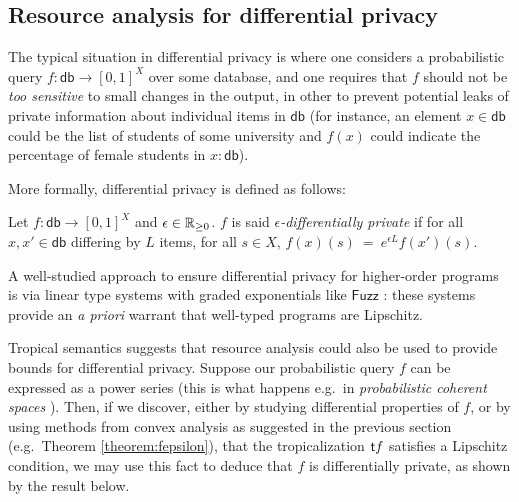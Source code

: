 

\subsection{Resource analysis for differential privacy}

The typical situation in differential privacy is where one considers a probabilistic query $f: \mathsf{db}\to [0,1]^{X}$ over some database, and one requires that $f$ should not be \emph{too sensitive} to small changes in the output, in other to prevent potential leaks of private information about individual items in $\mathsf{db}$ (for instance, an element $x\in\mathsf{db}$ could be the list of students of some university and $f(x)$ could indicate the percentage of female students in $x:\mathsf{db}$).

More formally, differential privacy is defined as follows:
\begin{definition}
Let $f: \mathsf{db}\to [0,1]^{X}$ and $\epsilon \in \mathbb{R}_{\geq 0}$. $f$ is said \emph{$\epsilon$-differentially private} if for all $x,x'\in \mathsf{db}$
differing by $L$ items, for all $s\in X$, 
$
f(x)(s) \ = \ e^{\epsilon L} f(x')(s)
$.
\end{definition}

A well-studied approach to ensure differential privacy for higher-order programs is via linear type systems with graded exponentials like $\mathsf{Fuzz}$ \cite{Reed2010}: these systems provide an \emph{a priori} warrant that well-typed programs are Lipschitz.

Tropical semantics suggests that resource analysis could also be used to provide bounds for differential privacy. 
Suppose our probabilistic query $f$ can be expressed as a power series (this is what happens e.g.~in \emph{probabilistic coherent spaces} \cite{Ehrhard2011}). Then, if we discover, either by studying differential properties of $f$, or by using methods from convex analysis as suggested in the previous section (e.g.~Theorem \ref{theorem:fepsilon}), 
 that the tropicalization $\mathsf{t} f$ satisfies a Lipschitz condition, we may use this fact to deduce that $f$ is differentially private, as shown by the result below.

%
%

